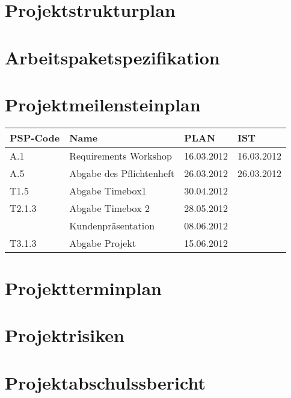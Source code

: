 \documentclass[10pt,a4paper,titlepage]{article}
\begin{document}
\section{Projektstrukturplan}
\newpage

\section{Arbeitspaketspezifikation}
\newpage

\section{Projektmeilensteinplan}
\begin{tabular}[t]{|p{2cm}|p{4.2cm}|p{2cm}|p{2cm}|}
\hline
\textbf{PSP-Code} & \textbf{Name} & \textbf{PLAN} & \textbf{IST} \\
\hline
A.1 & Requirements Workshop & 16.03.2012 & 16.03.2012 \\
\hline
A.5 & Abgabe des Pflichtenheft & 26.03.2012 & 26.03.2012 \\
\hline
T1.5 & Abgabe Timebox1 & 30.04.2012 & \\
\hline
T2.1.3 & Abgabe Timebox 2 & 28.05.2012 & \\
\hline
& Kundenpräsentation & 08.06.2012 & \\
\hline
T3.1.3 & Abgabe Projekt & 15.06.2012 & \\
\hline
\end{tabular}
\newpage

\section{Projektterminplan}
\newpage

\section{Projektrisiken}
\newpage

\section{Projektabschulssbericht}
\newpage
\end{document}

